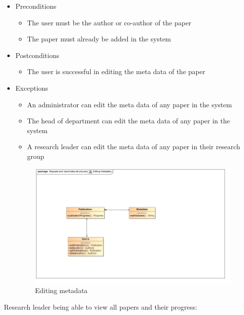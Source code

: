 \documentclass[a4paper,12pt]{article}
\begin{document}
\begin{itemize}
    \item Preconditions
    \begin{itemize}
        \item The user must be the author or co-author of the paper
        \item The paper must already be added in the system
    \end{itemize}
    \item Postconditions
    \begin{itemize}
        \item The user is successful in editing the meta data of the paper
    \end{itemize}
    \item Exceptions
    \begin{itemize}
        \item An administrator can edit the meta data of any paper in the system
        \item The head of department can edit the meta data of any paper in the system
        \item A research leader can edit the meta data of any paper in their research group
    \end{itemize}
    
    \begin{figure}[H]
    \centering
    \caption{Editing metadata}
    \includegraphics[width=1\textwidth]{use-case/editing-metadata.png}
    \end{figure}
\end{itemize}
Research leader being able to view all papers and their progress:
\end{document}
